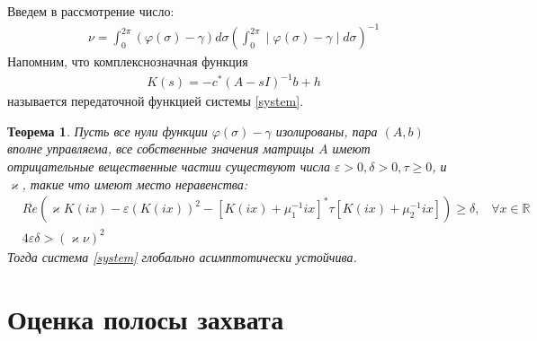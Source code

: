 \documentclass[a4paper,14pt]{article} %
\newtheorem{theorem}{Теорема}
\begin{document}
Введем в рассмотрение число:
 \begin{equation}
 \begin{aligned}
\nu = \int_{0}^{2\pi} (\varphi(\sigma) - \gamma) d\sigma (\int_{0}^{2\pi} \mid \varphi(\sigma) - \gamma \mid d\sigma)^{-1}
 \end{aligned}
\end{equation}
Напомним, что комплекснозначная функция
 \begin{equation}
 \begin{aligned}
K(s) = -c^*(A - sI)^{-1}b + h
\end{aligned}
\end{equation}
называется передаточной функцией системы \eqref{system}.

\begin{theorem}\label{th1}
Пусть все нули функции $\varphi(\sigma) - \gamma$ изолированы, пара $(A, b)$ вполне управляема, все собственные значения матрицы $A$ имеют отрицательные вещественные частии существуют числа $\varepsilon > 0, \delta > 0, \tau \geqslant 0$, и $\varkappa$, такие что имеют место неравенства:
 \begin{align}
&Re(\varkappa K(ix)- \varepsilon(K(ix))^2-[K(ix)+\mu_1^{-1}ix]^*\tau[K(ix)+\mu_2^{-1}ix])\geqslant\delta\text{,}\quad \forall x \in \mathbb{R}\label{first_th_eq}\\
&4\varepsilon\delta > (\varkappa\nu)^2\label{second_th_eq}
\end{align}
Тогда система \eqref{system} глобально асимптотически устойчива.
\end{theorem}

\pagebreak
\section{Оценка полосы захвата}
\end{document}
